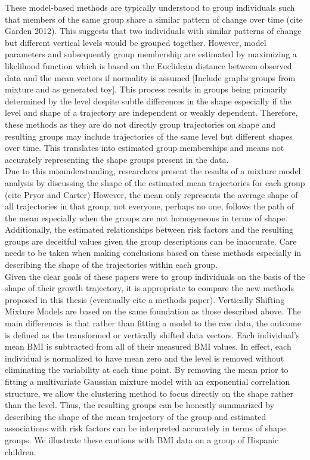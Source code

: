 These model-based methods are typically understood to group individuals such that members of the same group share a similar pattern of change over time (cite Garden 2012). This suggests that two individuals with similar patterns of change but different vertical levels would be grouped together. However, model parameters and subsequently group membership are estimated by maximizing a likelihood function which is based on the Euclidean distance between observed data and the mean vectors if normality is assumed [Include graphs groups from mixture and as generated toy]. This process results in groups being primarily determined by the level despite subtle differences in the shape especially if the level and shape of a trajectory are independent or weakly dependent. Therefore, these methods as they are do not directly group trajectories on shape and resulting groups may include trajectories of the same level but different shapes over time. This translates into estimated group memberships and means not accurately representing the shape groups present in the data.\\

Due to this misunderstanding, researchers present the results of a mixture model analysis by discussing the shape of the estimated mean trajectories for each group (cite Pryor and Carter) However, the mean only represents the average shape of all trajectories in that group; not everyone, perhaps no one, follows the path of the mean especially when the groups are not homogeneous in terms of shape. Additionally, the estimated relationships between risk factors and the resulting groups are deceitful values given the group descriptions can be inaccurate. Care needs to be taken when making conclusions based on these methods especially in describing the shape of the trajectories within each group.  \\

Given the clear goals of these papers were to group individuals on the basis of the shape of their growth trajectory, it is appropriate to compare the new methods proposed in this thesis (eventually cite a methods paper). Vertically Shifting Mixture Models are based on the same foundation as those described above. The main differences is that rather than fitting a model to the raw data, the outcome is defined as the transformed or vertically shifted data vectors. Each individual's mean BMI is subtracted from all of their measured BMI values. In effect, each individual is normalized to have mean zero and the level is removed without eliminating the variability at each time point. By removing the mean prior to fitting a multivariate Gaussian mixture model with an exponential correlation structure, we allow the clustering method to focus directly on the shape rather than the level. Thus, the resulting groups can be honestly summarized by describing the shape of the mean trajectory of the group and estimated associations with risk factors can be interpreted accurately in terms of shape groups. We illustrate these cautions with BMI data on a group of Hispanic children.

